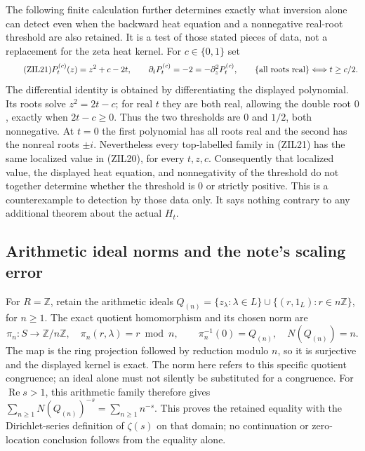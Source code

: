 The following finite calculation further determines exactly what
inversion alone can detect even when the backward heat equation
and a nonnegative real-root threshold are also retained. It is
a test of those stated pieces of data, not a replacement for the
zeta heat kernel. For $c\in\{0,1\}$ set
\begin{equation}\tag{ZIL21}
 P_t^{(c)}(z)=z^2+c-2t,\qquad
 \partial_tP_t^{(c)}=-2=-\partial_z^2P_t^{(c)},\qquad
 \{\hbox{all roots real}\}\Longleftrightarrow t\ge c/2.
\end{equation}
The differential identity is obtained by differentiating the
displayed polynomial. Its roots solve $z^2=2t-c$; for real $t$
they are both real, allowing the double root $0$, exactly when
$2t-c\ge0$. Thus the two thresholds are $0$ and $1/2$,
both nonnegative. At $t=0$ the first polynomial has all roots
real and the second has the nonreal roots $\pm i$.
Nevertheless every top-labelled family in (ZIL21) has the same
localized value in (ZIL20), for every $t,z,c$.
Consequently that localized value, the displayed heat equation,
and nonnegativity of the threshold do not together determine
whether the threshold is $0$ or strictly positive. This is a
counterexample to detection by those data only. It says nothing
contrary to any additional theorem about the actual $H_t$.

\subsection{Arithmetic ideal norms and the note's scaling error}

For $R=\mathbb Z$, retain the arithmetic ideals
$Q_{(n)}=\{z_\lambda:\lambda\in L\}
\cup\{(r,1_L):r\in n\mathbb Z\}$, for $n\ge1$.
The exact quotient homomorphism and its chosen norm are
\begin{equation}\tag{ZIL22}
 \pi_n:S\longrightarrow\mathbb Z/n\mathbb Z,\quad
       \pi_n(r,\lambda)=r\bmod n,\qquad
 \pi_n^{-1}(0)=Q_{(n)},\quad N(Q_{(n)})=n.
\end{equation}
The map is the ring projection followed by reduction modulo $n$,
so it is surjective and the displayed kernel is exact. The norm
here refers to this specific quotient congruence; an ideal alone
must not silently be substituted for a congruence.
For $\operatorname{Re}s>1$, this arithmetic family therefore gives
$\sum_{n\ge1}N(Q_{(n)})^{-s}=\sum_{n\ge1}n^{-s}$.
This proves the retained equality with the Dirichlet-series
definition of $\zeta(s)$ on that domain; no continuation or
zero-location conclusion follows from the equality alone.

